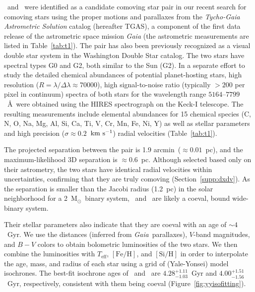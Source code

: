 \documentclass[12pt,letterpaper,margin=1in]{article}
\newcommand{\project}[1]{\textsl{#1}}
\newcommand{\acronym}[1]{{\small{#1}}}
\newcommand{\gaia}{\project{Gaia}}
\newcommand{\sectionname}{Section}
\newcommand{\figname}{Figure}
\newcommand{\tgas}{\acronym{TGAS}}
\newcommand*\elem[1]{\ensuremath{\mathrm{#1}}}
\newcommand*\elemH[1]{\ensuremath{[\mathrm{#1}/\elem{H}]}}
\newcommand{\sunanalog}{\text{Krios}}
\newcommand{\bizarreone}{\text{Kronos}}
\newcommand{\kms}{\ensuremath{\rm km~s^{-1}}}
\newcommand{\msun}{\ensuremath{{\mathrm M}_\odot}}
\renewcommand\tablename{Table}
\begin{document}
\sunanalog\ and \bizarreone\ were identified as a candidate comoving star pair
in our recent search\cite{2017AJ....153..257O} for comoving stars using the
proper motions and parallaxes from the {\it Tycho-Gaia Astrometric Solution}
catalog (hereafter \tgas), a component of the first data release of the
astrometric space mission \gaia\cite{2016A&A...595A...2G} (the astrometric
measurements are listed in \tablename~\ref{tab:t1}).
The pair has also been previously recognized as a visual double star system
in the Washington Double Star catalog\cite{2001AJ....122.3466M}.
The two stars have spectral types G0 and G2, both similar to the Sun (G2).
In a separate effort to study the detailed chemical abundances of potential
planet-hosting stars, high resolution ($R=\lambda/\Delta\lambda\approx 70000$),
high signal-to-noise ratio (typically $>200$ per pixel in continuum) spectra of
both stars for the wavelength range $5164$--$7799$~\AA\ were obtained using the
HIRES spectrograph on the Keck-I telescope\cite{2016ApJS..225...32B}.
The resulting measurements include elemental abundances for 15 chemical species
(C, N, O, Na, Mg, Al, Si, Ca, Ti, V, Cr, Mn, Fe, Ni, Y) as well as stellar
parameters and high precision ($\sigma\approx0.2$~\kms) radial velocities
(Table~\ref{tab:t1}).

The projected separation between the pair is 1.9 arcmin\ ($\approx 0.01$~pc),
and the maximum-likelihood 3D separation is $\approx 0.6$~pc.
Although selected based only on their astrometry, the two stars
have identical radial velocities within uncertainties,
confirming that they are truly comoving (\sectionname~\ref{supp:dxdv}).
As the separation is smaller than the Jacobi radius (1.2~pc) in the solar
neighborhood for a 2~\msun\ binary system\cite{Jiang:2010aa}, \bizarreone\ and
\sunanalog\ are likely a coeval, bound wide-binary system.

Their stellar parameters also indicate that they are coeval with an age of $\sim 4$~Gyr.
We use the distances (inferred from \gaia\ parallaxes), $V$-band magnitudes,
and $B-V$ colors to obtain bolometric luminosities of the two stars\cite{2003AJ....126..778V}.
We then combine the luminosities with $T_\mathrm{eff}$, \elemH{Fe}, and
\elemH{Si} in order to interpolate the age, mass, and radius of each star
using a grid of (Yale-Yonsei) model isochrones\cite{2013ApJ...776...87S}.
The best-fit isochrone ages of \bizarreone\ and \sunanalog\ are
$4.28_{-1.03}^{+1.11}$~Gyr and $4.00_{-1.56}^{+1.51}$~Gyr, respectively,
consistent with them being coeval (\figname~\ref{fig:yyisofitting}).
\end{document}
